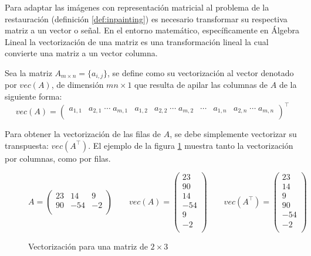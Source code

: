 Para adaptar las im\'agenes con representaci\'on matricial al problema de la restauraci\'on (definición \ref{def:inpainting}) es necesario transformar su respectiva matriz a un vector o señal. En el entorno matem\'atico, específicamente en \'Algebra Lineal \cite{enwiki:la} la vectorizaci\'on de una matriz es una transformaci\'on lineal la cual convierte una matriz a un vector columna.
\begin{definition}
	Sea la matriz $A_{m \times n} = \{a_{i,j}\}$, se define como su vectorizaci\'on al vector denotado por $vec(A)$, de dimensi\'on $mn \times 1$ que resulta de apilar las columnas de $A$ de la siguiente forma:
	\begin{equation*}
		vec(A) = \left(
		\begin{array}{ccccccc}
		a_{1,1}&a_{2,1}\;\cdots\;a_{m,1}&a_{1,2}&a_{2,2}\;\cdots\;a_{m,2}&\cdots&a_{1,n}&a_{2,n}\;\cdots\;a_{m,n}\\
		\end{array} \right)^\intercal
	\end{equation*}
\end{definition}
Para obtener la vectorizaci\'on de las filas de $A$, se debe simplemente vectorizar su transpuesta: $vec(A^\intercal)$. El ejemplo de la figura \ref{ex:vectorization} muestra tanto la vectorizaci\'on por columnas, como por filas.

\begin{figure}[h]
	\[
		A = \left(
		\begin{matrix}
			23 & 14 & 9\\
			90 & -54 & -2\\
		\end{matrix}\right)
		\qquad
		vec(A) = \left(
		\begin{matrix}
			23\\
			90\\
			14\\
			-54\\
			9\\
			-2\\
		\end{matrix}\right)
		\qquad
		vec(A^\intercal) = \left(
		\begin{matrix}
			23\\
			14\\
			9\\
			90\\
			-54\\
			-2\\
		\end{matrix}\right)
	\]
	\caption{Vectorizaci\'on para una matriz de $2 \times 3$}
	\label{ex:vectorization}
\end{figure}

